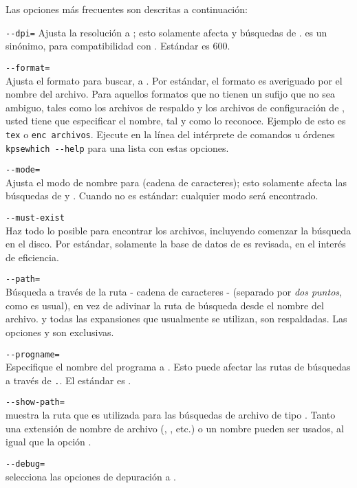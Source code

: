 \documentclass{article}
\begin{document}
Las opciones más frecuentes son descritas a continuación:

\begin{ttdescription}
	\item[\texttt{-{}-dpi=\var{num}}]\mbox{}
	Ajusta la resolución a ; esto solamente afecta
	 y búsquedas de .  es un sinónimo,
	para compatibilidad con . Estándar es 600.  
\item[\texttt{-{}-format=\var{name}}]\mbox{}\\
	Ajusta el formato para buscar, a . Por estándar,
	el formato es averiguado por el nombre del archivo. Para
	aquellos formatos que no tienen un sufijo que no sea ambiguo,
	tales como los archivos de respaldo \MP{} y los archivos de
	configuración de , usted tiene que especificar
	el nombre, tal y como \KPS{} lo reconoce. Ejemplo de esto es
	\texttt{tex} o \texttt{enc archivos}. Ejecute en la línea del intérprete de
	comandos u órdenes \texttt{kpsewhich -{}-help} para una lista con estas opciones. 
\item[\texttt{-{}-mode=\var{string}}]\mbox{}\\
        Ajusta el modo de nombre para  (cadena de
        caracteres); esto solamente afecta las búsquedas de 
        y . Cuando no es estándar: cualquier modo será
        encontrado. 
\item[\texttt{-{}-must-exist}]\mbox{}\\
	Haz todo lo posible para encontrar los archivos, incluyendo
	comenzar la búsqueda en el disco. Por estándar, solamente la
	base de datos de  es revisada, en el interés de
	eficiencia. 
\item[\texttt{-{}-path=\var{string}}]\mbox{}\\
	Búsqueda a través de la ruta  - cadena de caracteres - (separado
	por \emph{dos puntos}, como es usual), en vez de adivinar la ruta
	de búsqueda desde el nombre del archivo. \samp{//} y
	todas las expansiones que usualmente se utilizan, son respaldadas. Las
	opciones  y  son
	exclusivas.
\item[\texttt{-{}-progname=\var{name}}]\mbox{}\\
	Especifique el nombre del programa a \texttt{}.
	Esto puede afectar las rutas de búsquedas a través de
	\texttt{.}. El estándar es .
\item[\texttt{-{}-show-path=\var{name}}]\mbox{}\\
	muestra la ruta que es utilizada para las búsquedas de archivo de tipo
	\texttt{}. 
        Tanto una extensión de nombre de archivo (,
        , etc.) o un nombre pueden ser usados, al igual que
        la opción .
\item[\texttt{-{}-debug=\var{num}}]\mbox{}\\
	selecciona las opciones de depuración a \texttt{}.
\end{ttdescription}
\end{document}
